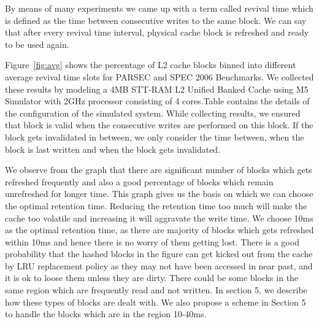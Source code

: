 By means of many experiments we came up with a term called revival time which is defined as  the time between consecutive writes to the same block. We can say that after every revival time interval, physical cache block is refreshed and ready to be used again. 

Figure~\ref{fig:avg}  shows the percentage of L2 cache blocks binned into different average revival time slots for PARSEC and SPEC 2006 Benchmarks. We collected these results by modeling a 4MB STT-RAM L2 Unified Banked Cache using M5 Simulator with 2GHz processor consisting of 4 cores.Table contains the details of the configuration of the simulated system. While collecting results, we ensured that block is valid when the consecutive writes are performed on this block. If the block gets invalidated in between, we only consider the time between, when the block is last written and when the block gets invalidated. 

We observe from the graph that there are significant number of blocks which gets refreshed frequently and also a good percentage of blocks which remain unrefreshed for longer time. This graph gives us the basis on which we can choose the optimal retention time. Reducing the retention time too much will make the cache too volatile and increasing it will aggravate the write time.  We choose 10ms as the optimal retention time, as there are majority of blocks which gets refreshed within 10ms and hence there is no worry of them getting lost. There is a good probability that the hashed blocks in the figure can get kicked out from the cache by LRU replacement policy as they may not have been accessed in near past, and it is ok to loose them unless they are dirty. There could be some blocks in the same region which are frequently read and not written. In section 5, we describe how these types of blocks are dealt with. We also propose a scheme in Section 5 to handle the blocks which are in the region 10-40ms. 




  
  




